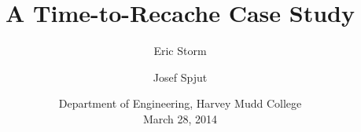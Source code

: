 \documentclass[pageno]{jpaper}
\begin{document}
\title{A Time-to-Recache Case Study}

\author{Eric Storm \and Josef Spjut}
\date{Department of Engineering, Harvey Mudd College\\March 28, 2014}
\maketitle


\begin{abstract}

\end{abstract}


% 

% 
% 
% 




\end{document}
